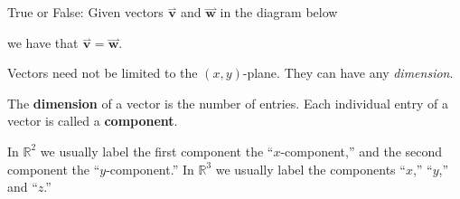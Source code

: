 \documentclass{ximera}
\begin{document}
\begin{question}
  True or False: Given vectors $\overset{\rightharpoonup}{\mathbf{v}}$ and $\overset{\rightharpoonup}{\mathbf{w}}$ in the diagram
  below
  \begin{image}
\end{image}
  we have that $\overset{\rightharpoonup}{\mathbf{v}}=\overset{\rightharpoonup}{\mathbf{w}}$.
  \begin{prompt}
  \begin{multipleChoice}
  \end{multipleChoice}
  \end{prompt}
\end{question}

Vectors need not be limited to the $(x,y)$-plane. They can have any \textit{dimension}.


\begin{definition}
The \textbf{dimension} of a vector is the number of entries. Each
individual entry of a vector is called a \textbf{component}.
\end{definition}

In $\mathbb{R}^2$ we usually label the first component the ``$x$-component,''
and the second component the ``$y$-component.'' In $\mathbb{R}^3$ we usually
label the components ``$x$,'' ``$y$,'' and ``$z$.''
\end{document}
